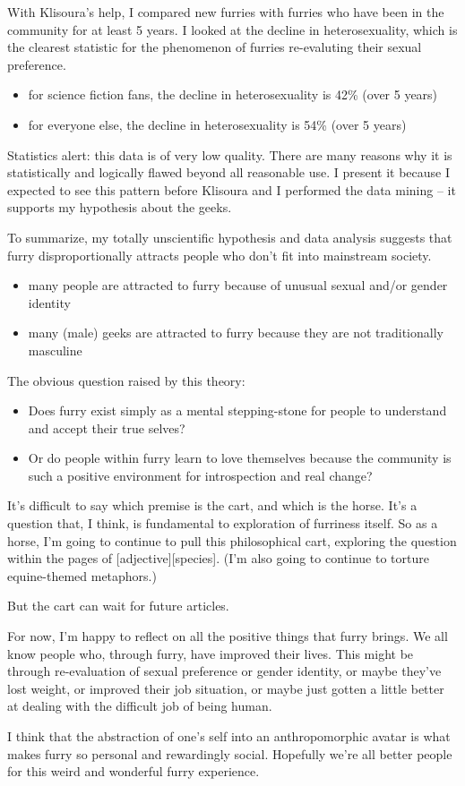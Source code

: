 With Klisoura's help, I compared new furries with furries who have been in the community for at least 5 years. I looked at the decline in heterosexuality, which is the clearest statistic for the phenomenon of furries re-evaluting their sexual preference.

\begin{itemize}
  \item for science fiction fans, the decline in heterosexuality is 42\% (over 5 years)
  \item for everyone else, the decline in heterosexuality is 54\% (over 5 years)
\end{itemize}

Statistics alert: this data is of very low quality. There are many reasons why it is statistically and logically flawed beyond all reasonable use. I present it because I expected to see this pattern before Klisoura and I performed the data mining -- it supports my hypothesis about the geeks.

To summarize, my totally unscientific hypothesis and data analysis suggests that furry disproportionally attracts people who don't fit into mainstream society.

\begin{itemize}
  \item many people are attracted to furry because of unusual sexual and/or gender identity
  \item many (male) geeks are attracted to furry because they are not traditionally masculine
\end{itemize}

The obvious question raised by this theory:

\begin{itemize}
  \item Does furry exist simply as a mental stepping-stone for people to understand and accept their true selves?
  \item Or do people within furry learn to love themselves because the community is such a positive environment for introspection and real change?
\end{itemize}

It's difficult to say which premise is the cart, and which is the horse. It's a question that, I think, is fundamental to exploration of furriness itself. So as a horse, I'm going to continue to pull this philosophical cart, exploring the question within the pages of [adjective][species]. (I'm also going to continue to torture equine-themed metaphors.)

But the cart can wait for future articles.

For now, I'm happy to reflect on all the positive things that furry brings. We
all know people who, through furry, have improved their lives. This might be through re-evaluation of sexual preference or gender identity, or maybe they've lost weight, or improved their job situation, or maybe just gotten a little better at dealing with the difficult job of being human.

I think that the abstraction of one's self into an anthropomorphic avatar is what makes furry so personal and rewardingly social. Hopefully we're all better people for this weird and wonderful furry experience.
